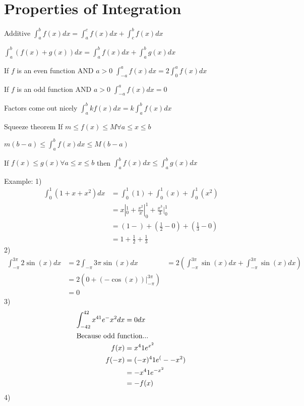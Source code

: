 \section{Properties of Integration}
Additive
$\int_a^b f(x) dx = \int_a^c f(x) dx + \int_c^b f(x) dx$

$\int_a^b (f(x)+g(x)) dx = \int_a^b f(x) dx + \int_a^b g(x) dx$

If $f$ is an even function AND $a > 0$
$\int_{-a}^{a} f(x) dx = 2\int_0^a f(x) dx$

If $f$ is an odd function AND $a > 0$
$\int_{-a}^{a} f(x) dx = 0$

Factors come out nicely
$\int_a^b k f(x) dx = k \int_a^b f(x) dx$


Squeeze theorem
If $m \leq f(x) \leq M \forall a \leq x \leq b$

$m(b-a) \leq \int_a^b f(x) dx \leq M(b-a)$

If $f(x) \leq g(x) \forall a \leq x \leq b$
then
$\int_a^b f(x) dx \leq \int_a^b g(x) dx$

Example:
1)
\begin{align}
\int_0^1 (1 + x + x^2) dx
  &= \int_0^1 (1) + \int_0^1 (x) + \int_0^1 (x^2) \\
  &= x|_0^1 + \frac{x^2}{x}|_0^1 + \frac{x^3}{3}|_0^1 \\
  &= (1-) + (\frac{1}{2}-0) + (\frac{1}{3}-0) \\
  &= 1+\frac{1}{2} +\frac{1}{3}
\end{align}
2)
\begin{align}
\int_{-\pi}^{3\pi} 2\sin(x) dx &= 2 \int_{-\pi}{3\pi}\sin(x)dx
 &= 2\left(\int_{-\pi}^{3\pi} \sin(x) dx + \int_{-\pi}^{3\pi} \sin(x) dx \right) \\
 &= 2\left(0 + (-\cos(x))|_{-\pi}^{3\pi}\right) \\
 &= 0
\end{align}
3)
\begin{align}
  \int_{-42}^{42} x^{41}e^-{x^2} dx &= 0 dx \\
  \intertext{Because odd function...}
  f(x) &= x^41 e^{x^2} \\
  f(-x) &= (-x)^41 e^(- -x^2) \\
  &= -x^41 e^{-x^2} \\
  &= -f(x)
\end{align}
4)

